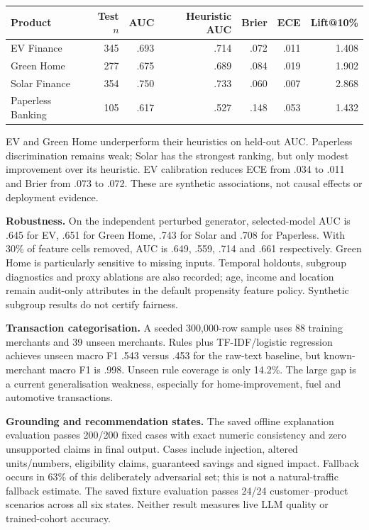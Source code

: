 \documentclass[10pt,a4paper]{article}
\newcommand{\sect}[1]{\vspace{5pt}{\large\bfseries\color{greenr}#1}\par\vspace{1pt}}
\begin{document}
\begin{center}\small
\setlength{\tabcolsep}{5pt}
\begin{tabular}{lrrrrrr}
\toprule
Product & Test $n$ & AUC & Heuristic AUC & Brier & ECE & Lift@10\%\\
\midrule
EV Finance & 345 & .693 & .714 & .072 & .011 & 1.408\\
Green Home & 277 & .675 & .689 & .084 & .019 & 1.902\\
Solar Finance & 354 & .750 & .733 & .060 & .007 & 2.868\\
Paperless Banking & 105 & .617 & .527 & .148 & .053 & 1.432\\
\bottomrule
\end{tabular}
\end{center}
EV and Green Home underperform their heuristics on held-out AUC. Paperless discrimination remains weak; Solar has the strongest ranking, but only modest improvement over its heuristic. EV calibration reduces ECE from .034 to .011 and Brier from .073 to .072. These are synthetic associations, not causal effects or deployment evidence.

\newpage
\sect{2\quad Experiments run so far and results, continued}
\textbf{Robustness.} On the independent perturbed generator, selected-model AUC is .645 for EV, .651 for Green Home, .743 for Solar and .708 for Paperless. With 30\% of feature cells removed, AUC is .649, .559, .714 and .661 respectively. Green Home is particularly sensitive to missing inputs. Temporal holdouts, subgroup diagnostics and proxy ablations are also recorded; age, income and location remain audit-only attributes in the default propensity feature policy. Synthetic subgroup results do not certify fairness.

\textbf{Transaction categorisation.} A seeded 300,000-row sample uses 88 training merchants and 39 unseen merchants. Rules plus TF-IDF/logistic regression achieves unseen macro F1 .543 versus .453 for the raw-text baseline, but known-merchant macro F1 is .998. Unseen rule coverage is only 14.2\%. The large gap is a current generalisation weakness, especially for home-improvement, fuel and automotive transactions.

\textbf{Grounding and recommendation states.} The saved offline explanation evaluation passes 200/200 fixed cases with exact numeric consistency and zero unsupported claims in final output. Cases include injection, altered units/numbers, eligibility claims, guaranteed savings and signed impact. Fallback occurs in 63\% of this deliberately adversarial set; this is not a natural-traffic fallback estimate. The saved fixture evaluation passes 24/24 customer--product scenarios across all six states. Neither result measures live LLM quality or trained-cohort accuracy.
\end{document}
